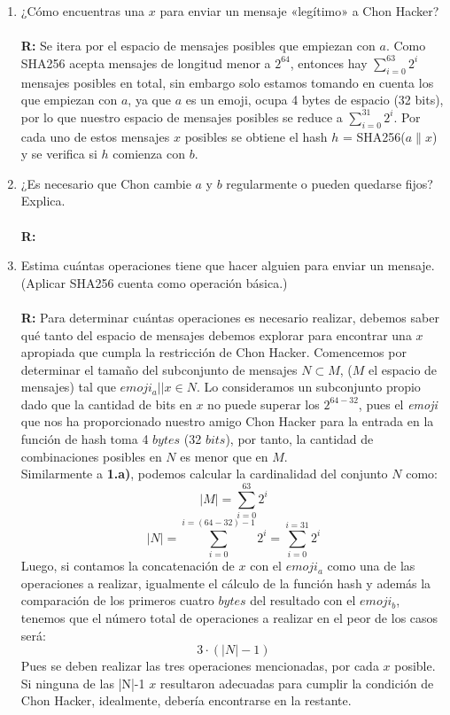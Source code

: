 \documentclass[14pt]{article}
\begin{document}
\begin{enumerate}[label=\alph*)]
\item ¿Cómo encuentras una $x$ para enviar un mensaje «legítimo» a Chon Hacker? \\ \\
\textbf{R:} Se itera por el espacio de mensajes posibles que empiezan con $a$. Como SHA256 acepta mensajes de longitud menor a $2^{64}$, entonces hay $\sum_{i = 0}^{63} 2^i$ mensajes posibles en total, sin embargo solo estamos tomando en cuenta los que empiezan con $a$, ya que $a$ es un emoji, ocupa 4 bytes de espacio (32 bits), por lo que nuestro espacio de mensajes posibles se reduce a $\sum_{i = 0}^{31} 2^i$. Por cada uno de estos mensajes $x$ posibles se obtiene el hash $h$ = SHA256($a \parallel x$)  y se verifica si $h$ comienza con $b$.

\item ¿Es necesario que Chon cambie $a$ y $b$ regularmente o pueden quedarse fijos? Explica. \\ \\
  \textbf{R:}  
  
\item Estima cuántas operaciones tiene que hacer alguien para enviar un mensaje. (Aplicar SHA256 cuenta como operación básica.) \\ \\
  \textbf{R:}
  Para determinar cuántas operaciones es necesario realizar, debemos saber qué tanto del espacio de mensajes debemos explorar para encontrar una $x$ apropiada que cumpla la restricción de Chon Hacker.
  Comencemos por determinar el
  tamaño del subconjunto de mensajes $N \subset M$, ($M$ el espacio de mensajes) tal que $emoji_a || x \in N$. Lo consideramos un subconjunto
  propio dado que la cantidad de bits en $x$ no puede superar los $2^{64-32}$, pues el \textit{emoji}
  que nos ha proporcionado nuestro amigo Chon Hacker para la entrada en la función de hash toma 4 $bytes$ (32 $bits$), por tanto, la cantidad de combinaciones posibles en $N$ es menor que en $M$.\\
  
  Similarmente a \textbf{1.a)}, podemos calcular la cardinalidad del conjunto $N$ como:
  \begin{equation}
    |M| = \sum_{i = 0}^{63} 2^i
  \end{equation}
  \begin{equation}
    |N| = \sum_{i = 0}^{i = (64-32)-1}2^i = \sum_{i = 0}^{i = 31}2^i
  \end{equation}
  Luego, si contamos la concatenación de $x$ con el $emoji_a$ como una de las operaciones a realizar, igualmente el cálculo de la función hash y además la comparación de los primeros cuatro $bytes$
  del resultado con el $emoji_b$, tenemos que el número total de operaciones a realizar en el
  peor de los casos será:
  \begin{equation}
    3 \cdot (|N| - 1)
  \end{equation}
  Pues se deben realizar las tres operaciones mencionadas, por cada $x$ posible. Si ninguna de
  las |N|-1 $x$ resultaron adecuadas para cumplir la condición de Chon Hacker, idealmente, debería
  encontrarse en la restante.\\
  

\end{enumerate}
\end{document}
